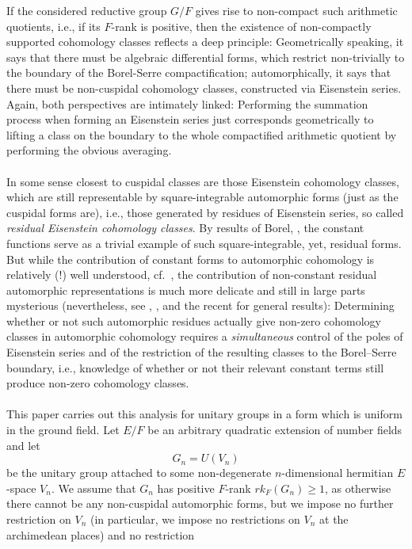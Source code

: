 \documentclass[a4paper,10pt]{amsart}
\theoremstyle{definition}
\numberwithin{equation}{section}
\begin{document}
If the considered reductive group $G/F$ gives rise to non-compact such arithmetic quotients, i.e., if its $F$-rank is positive, then the existence of non-compactly supported cohomology classes reflects a deep principle: Geometrically speaking, it says that there must be algebraic differential forms, which restrict non-trivially to the boundary of the Borel-Serre compactification; automorphically, it says that there must be non-cuspidal cohomology classes, constructed via Eisenstein series. Again, both perspectives are intimately linked: Performing the summation process when forming an Eisenstein series just corresponds geometrically to lifting a class on the boundary to the whole compactified arithmetic quotient by performing the obvious averaging.\\\\ In some sense closest to cuspidal classes are those Eisenstein cohomology classes, which are still representable by square-integrable automorphic forms (just as the cuspidal forms are), i.e., those generated by residues of Eisenstein series, so called {\it residual Eisenstein cohomology classes}. By results of Borel, \cite{bor1}, the constant functions serve as a trivial example of such square-integrable, yet, residual forms. But while the contribution of constant forms to automorphic cohomology is relatively (!) well understood, cf.\ \cite{franke2}, the contribution of non-constant residual automorphic representations is much more delicate and still in large parts mysterious (nevertheless, see \cite{grob22}, \cite{rosp}, \cite{grobner-EisRes} and the recent \cite{mundy} for general results): Determining whether or not such automorphic residues actually give non-zero cohomology classes in automorphic cohomology requires a {\it simultaneous} control of the poles of Eisenstein series and of the restriction of the resulting classes to the Borel--Serre boundary, i.e., knowledge of whether or not their relevant constant terms still produce non-zero cohomology classes. \\\\
This paper carries out this analysis for unitary groups in a form which is
uniform in the ground field. Let \(E/F\) be an arbitrary quadratic
extension of number fields and let
$$
        G_n=U(V_n)
$$
be the unitary group attached to some non-degenerate $n$-dimensional  hermitian \(E\)-space
\(V_n\). We assume that \(G_n\) has positive \(F\)-rank $rk_F(G_n)\geq 1$, as otherwise there cannot be any non-cuspidal automorphic forms, but we impose no further
restriction on $V_n$ (in particular, we impose no restrictions on $V_n$ at the archimedean places) and no restriction
\end{document}
